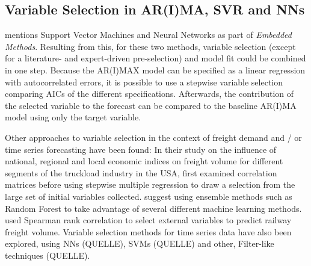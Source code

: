 \documentclass[a4paper, 11pt]{article}
\begin{document}
\subsection{Variable Selection in AR(I)MA, SVR and NNs}
\cite{Chandrashekar.2014} mentions Support Vector Machines and Neural Networks as part of \textit{Embedded Methods}. Resulting from this, for these two methods, variable selection (except for a literature- and expert-driven pre-selection) and model fit could be combined in one step. 
Because the AR(I)MAX model can be specified as a linear regression with autocorrelated errors, it is possible to use a stepwise variable selection comparing AICs of the different specifications. Afterwards, the contribution of the selected variable to the forecast can be compared to the baseline AR(I)MA model using only the target variable. %

Other approaches to variable selection in the context of freight demand and / or time series forecasting have been found:
In their study on the influence of national, regional and local economic indices on freight volume for different segments of the truckload industry in the USA, \cite{Fite.2002} first examined correlation matrices before using stepwise multiple regression to draw a selection from the large set of initial variables collected. 
\cite{Taghizadeh.2017} suggest using ensemble methods such as Random Forest to take advantage of several different machine learning methods.
\cite{Feng.2018} used Spearman rank correlation to select external variables to predict railway freight volume.
Variable selection methods for time series data have also been explored, using NNs (QUELLE), SVMs (QUELLE) and other, Filter-like techniques (QUELLE).\\
\end{document}
